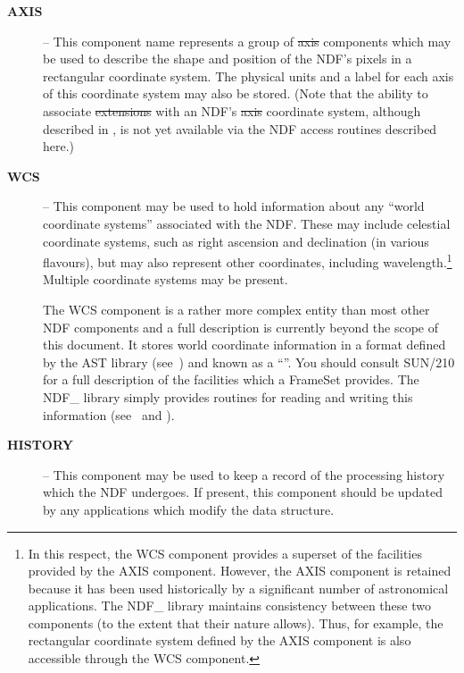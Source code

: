 \begin{description}

\item[{\bf AXIS}] -- This component name represents a group of \st{axis\/}
components which may be used to describe the shape and position of the NDF's
pixels in a rectangular coordinate system. 
The physical units and a label for each axis of this coordinate system may 
also be stored.
(Note that the ability to associate \st{extensions\/} with an NDF's
\st{axis\/} coordinate system, although described in 
, is not yet
available via the NDF access routines described here.) 

\item[{\bf WCS}] -- This component may be used to hold information
about any ``world coordinate systems'' associated with the NDF. These
may include celestial coordinate systems, such as right ascension and
declination (in various flavours), but may also represent other
coordinates, including wavelength.\footnote{In this respect, the WCS
component provides a superset of the facilities provided by the AXIS
component. However, the AXIS component is retained because it has been
used historically by a significant number of astronomical
applications. The NDF\_ library maintains consistency between these
two components (to the extent that their nature allows). Thus, for
example, the rectangular coordinate system defined by the AXIS
component is also accessible through the WCS component.}  Multiple
coordinate systems may be present.

The WCS component is a rather more complex entity than most other NDF
components and a full description is currently beyond the scope of
this document. It stores world coordinate information in a format
defined by the AST library (see~) and known as
a ``''. You should consult SUN/210
for a full description of the facilities which a FrameSet
provides. The NDF\_ library simply provides routines for reading and
writing this information (see~ and
).

\item[{\bf HISTORY}] -- This component may be used to keep a record of
the processing history which the NDF undergoes. 
If present, this component should be updated by any applications which
modify the data structure. 

\end{description}

